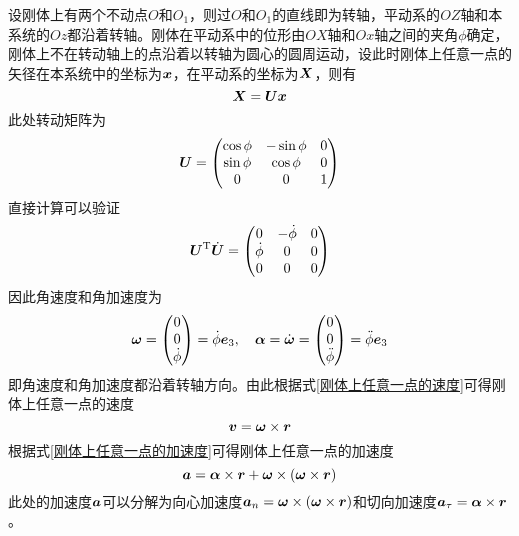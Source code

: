 设刚体上有两个不动点$O$和$O_1$，则过$O$和$O_1$的直线即为转轴，平动系的$OZ$轴和本系统的$Oz$都沿着转轴。刚体在平动系中的位形由$OX$轴和$Ox$轴之间的夹角$\phi$确定，刚体上不在转动轴上的点沿着以转轴为圆心的圆周运动，设此时刚体上任意一点的矢径在本系统中的坐标为$\boldsymbol{x}$，在平动系的坐标为$\boldsymbol{X}$，则有
\begin{equation*}
	\boldsymbol{X} = \boldsymbol{U} \boldsymbol{x}
\end{equation*}
此处转动矩阵为
\begin{equation}
	\boldsymbol{U} = \begin{pmatrix} \cos \phi & -\sin \phi & 0 \\ \sin \phi & \cos \phi & 0 \\ 0 & 0 & 1 \end{pmatrix}
	\label{定轴转动的转动矩阵}
\end{equation}
直接计算可以验证
\begin{equation*}
	\boldsymbol{U}^{\mathrm{T}} \dot{\boldsymbol{U}} = \begin{pmatrix} 0 & -\dot{\phi} & 0 \\ \dot{\phi} & 0 & 0 \\ 0 & 0 & 0 \end{pmatrix}
\end{equation*}
因此角速度和角加速度为
\begin{equation*}
	\boldsymbol{\omega} = \begin{pmatrix} 0 \\ 0 \\ \dot{\phi} \end{pmatrix} = \dot{\phi} \boldsymbol{e}_3,\quad \boldsymbol{\alpha} = \dot{\boldsymbol{\omega}} = \begin{pmatrix} 0 \\ 0 \\ \ddot{\phi} \end{pmatrix} = \ddot{\phi} \boldsymbol{e}_3
\end{equation*}
即角速度和角加速度都沿着转轴方向。由此根据式\eqref{刚体上任意一点的速度}可得刚体上任意一点的速度
\begin{equation*}
	\boldsymbol{v} = \boldsymbol{\omega} \times \boldsymbol{r}
\end{equation*}
根据式\eqref{刚体上任意一点的加速度}可得刚体上任意一点的加速度
\begin{equation*}
	\boldsymbol{a} = \boldsymbol{\alpha} \times \boldsymbol{r} + \boldsymbol{\omega} \times (\boldsymbol{\omega} \times \boldsymbol{r})
\end{equation*}
此处的加速度$\boldsymbol{a}$可以分解为向心加速度$\boldsymbol{a}_n = \boldsymbol{\omega} \times (\boldsymbol{\omega} \times \boldsymbol{r})$和切向加速度$\boldsymbol{a}_\tau = \boldsymbol{\alpha} \times \boldsymbol{r}$。

